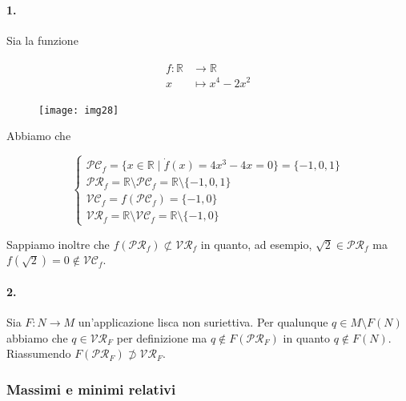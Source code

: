 \paragraph{1.}

Sia la funzione

\begin{align}
	\begin{split}
		f : \mathbb{R} &\to \mathbb{R}\\
		x &\mapsto x^{4} - 2 x^{2}
	\end{split}
\end{align}

\begin{figure}[H]
	\centering
	\texttt{[image: img28]}
\end{figure}

Abbiamo che

\begin{equation}
	\begin{cases}
		\mathcal{PC}_{f} = \{ x \in \mathbb{R} \mid \dot{f}(x) = 4 x^{3} - 4 x = 0 \} = \{ -1, 0, 1 \}\\
		\mathcal{PR}_{f} = \mathbb{R} \setminus \mathcal{PC}_{f} = \mathbb{R} \setminus \{ -1, 0, 1 \}\\
		\mathcal{VC}_{f} = f(\mathcal{PC}_{f}) = \{ -1, 0 \}\\
		\mathcal{VR}_{f} = \mathbb{R} \setminus \mathcal{VC}_{f} = \mathbb{R} \setminus \{ -1, 0 \}
	\end{cases}
\end{equation}

Sappiamo inoltre che $ f(\mathcal{PR}_{f}) \not\subset \mathcal{VR}_{f} $ in quanto, ad esempio, $ \sqrt{2} \in \mathcal{PR}_{f} $ ma $ f(\sqrt{2}) = 0 \notin \mathcal{VC}_{f} $.

\paragraph{2.}

Sia $ F : N \to M $ un'applicazione lisca non suriettiva. Per qualunque $ q \in M \setminus F(N) $ abbiamo che $ q \in \mathcal{VR}_{F} $ per definizione ma $ q \notin F(\mathcal{PR}_{F}) $ in quanto $ q \notin F(N) $.\\
Riassumendo $ F(\mathcal{PR}_{F}) \not\supset \mathcal{VR}_{F} $.

\subsubsection{Massimi e minimi relativi}

